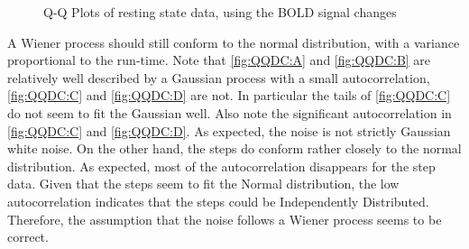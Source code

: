 \begin{figure}
\centering
{}
\caption{Q-Q Plots of resting state data, using the BOLD signal changes}
\label{fig:QQDelta}
\end{figure}

A Wiener process should still conform to the normal distribution, with a 
variance proportional to the run-time. Note that \autoref{fig:QQDC:A} and \autoref{fig:QQDC:B}
are relatively well described by a Gaussian process with a small autocorrelation, 
\autoref{fig:QQDC:C} and \autoref{fig:QQDC:D} are not. In particular the tails of \autoref{fig:QQDC:C}
do not seem to fit the Gaussian well. Also note the significant autocorrelation in
\autoref{fig:QQDC:C} and \autoref{fig:QQDC:D}. As expected, the noise is not strictly
Gaussian white noise.  On the other hand, the steps do conform rather
closely to the normal distribution.
As expected, most of the autocorrelation disappears for the step data. Given
that the steps seem to fit the Normal distribution, the low autocorrelation
indicates that the steps could be Independently Distributed. 
Therefore, the assumption that the noise follows a Wiener process seems to
be correct. 

